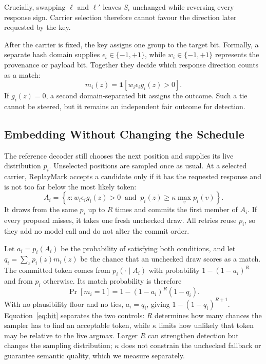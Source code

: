 Crucially, swapping $\ell$ and $\ell'$ leaves $S_i$ unchanged while reversing every response
sign. Carrier selection therefore cannot favour the direction later requested by the key.

After the carrier is fixed, the key assigns one group to the target bit. Formally, a separate hash
domain supplies $\epsilon_i\in\{-1,+1\}$, while $w_i\in\{-1,+1\}$ represents the provenance or
payload bit. Together they decide which response direction counts as a match:
\begin{equation}
m_i(z)=\mathbf{1}[w_i\epsilon_i g_i(z)>0].
\label{eq:m}
\end{equation}
If $g_i(z)=0$, a second domain-separated bit assigns the outcome. Such a tie cannot be steered,
but it remains an independent fair outcome for detection.

\subsection{Embedding Without Changing the Schedule}
\label{sec:embedding}

The reference decoder still chooses the next position and supplies its live distribution $p_i$.
Unselected positions are sampled once as usual. At a selected carrier, ReplayMark accepts a
candidate only if it has the requested response and is not too far below the most likely token:
\begin{equation}
A_i=\left\{z:
 w_i\epsilon_i g_i(z)>0\ \text{ and }\
 p_i(z)\geq \kappa\max_v p_i(v)
\right\}.
\label{eq:accept-set}
\end{equation}
It draws from the same $p_i$ up to $R$ times and commits the first member of $A_i$. If every
proposal misses, it takes one fresh unchecked draw. All retries reuse $p_i$, so they add no model
call and do not alter the commit order.

Let $a_i=p_i(A_i)$ be the probability of satisfying both conditions, and let
$q_i=\sum_z p_i(z)m_i(z)$ be the chance that an unchecked draw scores as a match. The committed
token comes from $p_i(\cdot\mid A_i)$ with probability $1-(1-a_i)^R$ and from $p_i$ otherwise.
Its match probability is therefore
\begin{equation}
\Pr[m_i=1]=1-(1-a_i)^R(1-q_i).
\label{eq:hit}
\end{equation}
With no plausibility floor and no ties, $a_i=q_i$, giving $1-(1-q_i)^{R+1}$. Equation~\eqref{eq:hit}
separates the two controls: $R$ determines how many chances the sampler has to find an acceptable
token, while $\kappa$ limits how unlikely that token may be relative to the live argmax. Larger $R$
can strengthen detection but changes the sampling distribution; $\kappa$ does not constrain the
unchecked fallback or guarantee semantic quality, which we measure separately.

